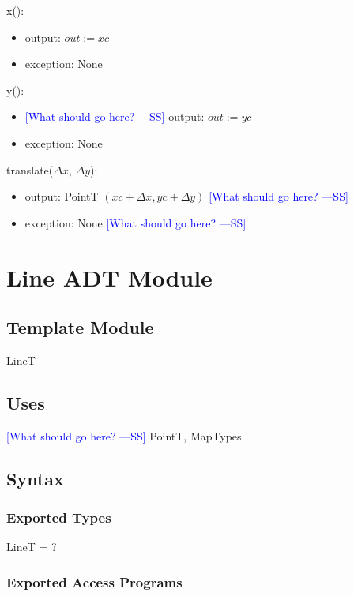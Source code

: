 \documentclass[12pt]{article}
\newcommand{\authornote}[3]{\textcolor{#1}{[#3 ---#2]}}
\newcommand{\authornote}[3]{}
\newcommand{\wss}[1]{\authornote{blue}{SS}{#1}}
\begin{document}
\noindent x():
\begin{itemize}
\item output: $out := xc$
\item exception: None
\end{itemize}

\noindent y():
\begin{itemize}
\item \wss{What should go here?}
 output: $out := yc$
\item exception: None
\end{itemize}

\noindent translate($\Delta x$, $\Delta y$):
\begin{itemize}
\item output: PointT $(xc + \Delta x, yc + \Delta y)$ \wss{What should go here?}
\item exception: None  \wss{What should go here?} %
\end{itemize}

\newpage

\section* {Line ADT Module}

\subsection*{Template Module}

LineT

\subsection* {Uses}

\wss{What should go here?} PointT, MapTypes

\subsection* {Syntax}

\subsubsection* {Exported Types}

LineT = ?

\subsubsection* {Exported Access Programs}
\end{document}

